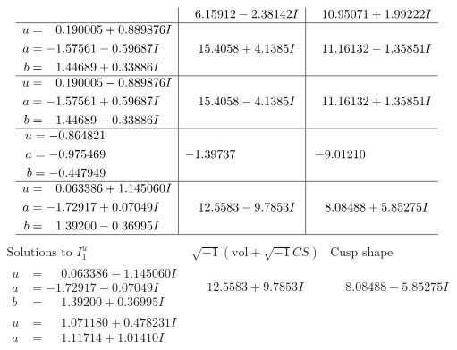 \documentclass[1p]{elsarticle_modified}
\theoremstyle{definition}
\newcommand{\I}{\sqrt{-1}}
\begin{document}
$$\begin{array}{c|c|c}
 & \phantom{-}6.15912 - 2.38142 I & \phantom{-}10.95071 + 1.99222 I \\ \hline\begin{aligned}
u &= \phantom{-}0.190005 + 0.889876 I \\
a &= -1.57561 - 0.59687 I \\
b &= \phantom{-}1.44689 + 0.33886 I\end{aligned}
 & \phantom{-}15.4058 + 4.1385 I & \phantom{-}11.16132 - 1.35851 I \\ \hline\begin{aligned}
u &= \phantom{-}0.190005 - 0.889876 I \\
a &= -1.57561 + 0.59687 I \\
b &= \phantom{-}1.44689 - 0.33886 I\end{aligned}
 & \phantom{-}15.4058 - 4.1385 I & \phantom{-}11.16132 + 1.35851 I \\ \hline\begin{aligned}
u &= -0.864821\phantom{ +0.000000I} \\
a &= -0.975469\phantom{ +0.000000I} \\
b &= -0.447949\phantom{ +0.000000I}\end{aligned}
 & -1.39737\phantom{ +0.000000I} & -9.01210\phantom{ +0.000000I} \\ \hline\begin{aligned}
u &= \phantom{-}0.063386 + 1.145060 I \\
a &= -1.72917 + 0.07049 I \\
b &= \phantom{-}1.39200 - 0.36995 I\end{aligned}
 & \phantom{-}12.5583 - 9.7853 I & \phantom{-}8.08488 + 5.85275 I\\
 \hline 
 \end{array}$$\newpage$$\begin{array}{c|c|c}  
\text{Solutions to }I^u_{1}& \I (\text{vol} + \sqrt{-1}CS) & \text{Cusp shape}\\
 \hline 
\begin{aligned}
u &= \phantom{-}0.063386 - 1.145060 I \\
a &= -1.72917 - 0.07049 I \\
b &= \phantom{-}1.39200 + 0.36995 I\end{aligned}
 & \phantom{-}12.5583 + 9.7853 I & \phantom{-}8.08488 - 5.85275 I \\ \hline\begin{aligned}
u &= \phantom{-}1.071180 + 0.478231 I \\
a &= \phantom{-}1.11714 + 1.01410 I \\

\end{aligned}
\end{array}$$
\end{document}
